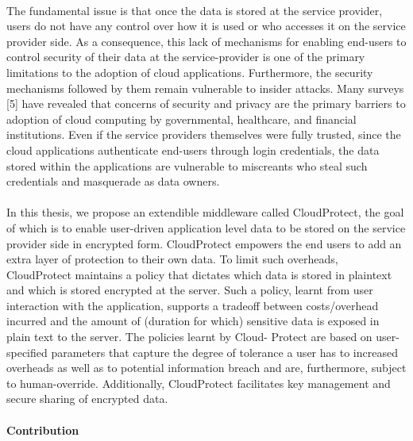 \documentclass[11pt,onecolumn]{article}
\begin{document}
\paragraph{}

The fundamental issue is that once the data is stored at the service provider, users
do not have any control over how it is used or who accesses it on the service provider
side. As a consequence, this lack of mechanisms for enabling end-users to control
security of their data at the service-provider is one of the primary limitations to the
adoption of cloud applications.  Furthermore, the security mechanisms followed by them
remain vulnerable to insider attacks. Many surveys [5] have revealed that concerns
of security and privacy are the primary barriers to adoption of cloud computing by
governmental, healthcare, and financial institutions. Even if the service providers
themselves were fully trusted, since the cloud applications authenticate end-users
through login credentials, the data stored within the applications are vulnerable to
miscreants who steal such credentials and masquerade as data owners.
\paragraph{}

In this thesis, we propose an extendible middleware called CloudProtect, the goal
of which is to enable user-driven application level data to be stored on the service
provider side in encrypted form. CloudProtect empowers the end users to add an extra
layer of protection to their own data.  To limit such overheads, CloudProtect maintains a
policy that dictates which data is stored in plaintext and which is stored encrypted at
the server. Such a policy, learnt from user interaction with the application, supports
a tradeoff between costs/overhead incurred and the amount of (duration for which)
sensitive data is exposed in plain text to the server. The policies learnt by Cloud-
Protect are based on user-specified parameters that capture the degree of tolerance a
user has to increased overheads as well as to potential information breach and are,
furthermore, subject to human-override. Additionally, CloudProtect facilitates key
management and secure sharing of encrypted data.

\paragraph{Contribution}
\end{document}

